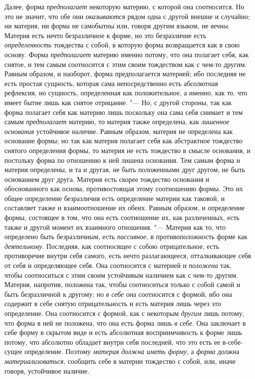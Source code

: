 Далее, форма {\em предполагает} некоторую материю, с
которой она соотносится. Но это не значит, что обе они
{\em оказываются} рядом одна с другой внешне и
случайно; ни материя, ни форма не самобытны или, говоря другим языком, не
{\em вечны}. Материя есть нечто безразличное к форме,
но это безразличие есть {\em определенность} тождества
с собой, в которую форма возвращается как в свою основу. Форма
{\em предполагает} материю именно потому, что она
полагает себя, как снятое, и тем самым соотносится с этим своим тождеством
как с чем-то другим. Равным образом, и наоборот, форма предполагается
материей; ибо последняя не есть простая сущность, которая сама
непосредственно есть абсолютная рефлексия, но сущность, определенная как
положительное, а именно, как то, что имеет бытие лишь как снятое отрицание.
"--- Но, с другой стороны, так как форма полагает себя как материю лишь
поскольку она сама себя снимает и тем самым
{\em предполагает} материю, то материя также
определена, как {\em лишенное основания} устойчивое
наличие. Равным образом, материя не определена как основание формы; но так
как материя полагает себя как абстрактное тождество снятого определения
формы, то материя не есть тождество в смысле основания, и постольку форма
по отношению к ней лишена основания. Тем самым форма и материя определены,
и та и другая, не быть положенными друг другом, не быть основанием друг
друга. Материя есть скорее тождество основания и обоснованного как основа,
противостоящая этому соотношению формы. Это их общее определение
безразличия есть определение материи как таковой, и составляет также и
взаимоотношение их обеих. Равным образом, и определение формы, состоящее в
том, что она есть соотношение их, как различенных, есть также и другой
момент их взаимного отношения. "--- Материя как то, что определено быть
безразличным, есть {\em пассивное}, в противоположность
форме как {\em деятельному}. Последняя, как соотносящее
с собою отрицательное, есть противоречие внутри себя самого, есть нечто
разлагающееся, отталкивающее себя от себя и определяющее себя. Она
соотносится с материей и {\em положена} так, чтобы
соотноситься с этим своим устойчивым наличием как с чем-то другим. Материя,
напротив, положена так, чтобы соотноситься только с собой самой и быть
безразличной к другому; но {\em в себе} она соотносится
с формой, ибо она содержит в себе снятую отрицательность и есть материя
лишь через это определение. Она соотносится с формой, как с некоторым
{\em другим} лишь потому, что форма в ней не положена,
что она есть форма лишь {\em в себе}. Она заключает в
себе форму в скрытом виде и есть абсолютная восприимчивость к форме лишь
потому, что абсолютно обладает внутри себя последней, что это есть ее
в-себе-сущее определение. Поэтому {\em материя должна
иметь форму}, а {\em форма} должна
{\em материализоваться}, сообщить себе в материи
тождество с собой, или, иначе говоря, устойчивое наличие.

